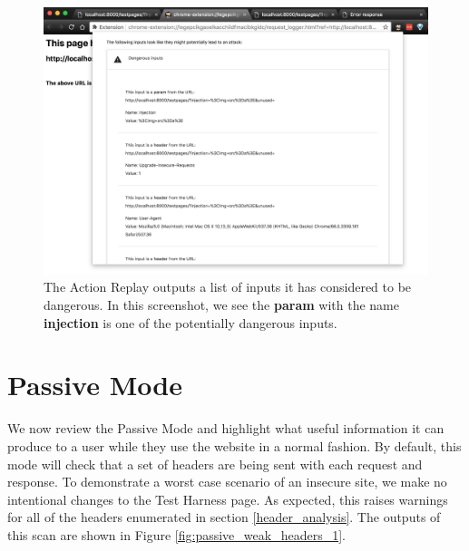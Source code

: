 \begin{figure}[h!]
	\centering
	\includegraphics[width=\textwidth]{images/dangerous_inputs.png}
	\caption{The Action Replay outputs a list of inputs it has considered to be dangerous. In this screenshot, we see the \textbf{param} with the name \textbf{injection} is one of the potentially dangerous inputs. }
	\label{fig:dangerous_inputs}
\end{figure}

\section{Passive Mode}

We now review the Passive Mode and highlight what useful information it can produce to a user while they use the website in a normal fashion. By default, this mode will check that a set of headers are being sent with each request and response. To demonstrate a worst case scenario of an insecure site, we make no intentional changes to the Test Harness page. As expected, this raises warnings for all of the headers enumerated in section \ref{header_analysis}. The outputs of this scan are shown in Figure \ref{fig:passive_weak_headers_1}. \\

